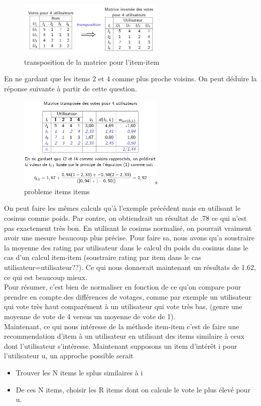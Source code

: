 \documentclass[oneside]{book}
\begin{document}
\begin{figure}[!ht]
\centering
\includegraphics[width = 7cm]{item_item.png}
\caption{transposition de la matrice pour l'item-item}
\label{fig:item_item_transpose}
\end{figure}

En ne gardant que les items 2 et 4 comme plus proche voisins. On peut déduire la réponse suivante à partir de cette question.
\begin{figure}[!ht]
\centering
\includegraphics[width = 7cm]{probleme_item_item.png}
\caption{probleme items items}
\label{fig:probleme_item_item}
\end{figure}

On peut faire les mêmes calculs qu'à l'exemple précédent mais en utilisant le cosinus comme poids. Par contre, on obtiendrait un résultat de .78 ce qui n'est pas exactement très bon. En utilisant le cosinus normalisé, on pourrait vraiment avoir une mesure beaucoup plus précise. Pour faire sa, nous avons qu'a soustraire la moyenne des rating par utilisateur dans le calcul du poids du cosinus dans le cas d'un calcul item-item (soustraire rating par item dans le cas utilisateur=utilisateur??). Ce qui nous donnerait maintenant un résultats de 1.62, ce qui est beaucoup mieux. \\

Pour résumer, c'est bien de normaliser en fonction de ce qu'on compare pour prendre en compte des différences de votages, comme par exemple un utilisateur qui vote très haut comparément à un utilisateur qui vote très bas. (genre une moyenne de vote de 4 versus un moyenne de vote de 1).\\

Maintenant, ce qui nous intéresse de la méthode item-item c'est de faire une recommendation d'item à un utilisateur en utilisant des items similaire à ceux dont l'utilisateur s'intéresse. Maintenant supposons un item d'intérêt i pour l'utilisateur u, un approche possible serait
\begin{itemize}
\item Trouver les N items le splus similaires à i
\item De ces N items, choisir les R items dont on calcule le vote le plus élevé pour u.
\end{itemize}
\end{document}
